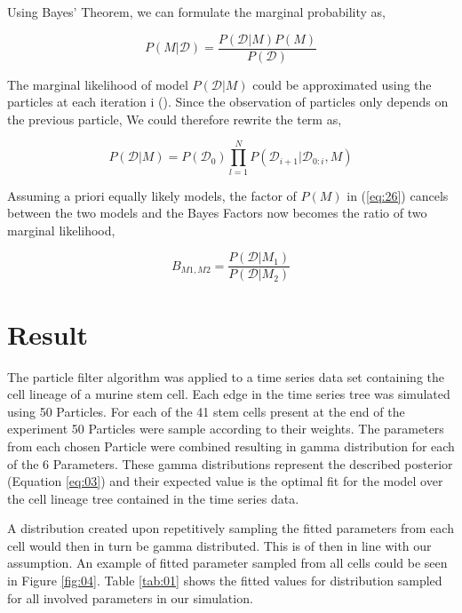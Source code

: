 \documentclass{bioinfo}
\begin{document}
Using Bayes' Theorem, we can formulate the marginal probability as,

\begin{equation}
P(M | \mathcal{D}) = \frac{P(\mathcal{D} | M) P(M)}{P(\mathcal{D})}\label{eq:27}
\end{equation}

The marginal likelihood of model $P(\mathcal{D} | M)$ could be approximated using the particles at each iteration i (\citealp{Wilkinson11}). Since the observation of particles only depends on the previous particle, We could therefore rewrite the term as,

\begin{equation}
P(\mathcal{D} | M) = P(\mathcal{D_0}) \prod_{l=1}^{N} P(\mathcal{D}_{i+1} | \mathcal{D}_{0:i}, M)\label{eq:28}
\end{equation}

Assuming a priori equally likely models, the factor of $P(M)$ in (\ref{eq:26}) cancels between the two models and the Bayes Factors now becomes the ratio of two marginal likelihood,

\begin{equation}
B_{M1, M2} = \frac{P(\mathcal{D} | M_1)}{P(\mathcal{D} | M_2)}\label{eq:29}
\end{equation}

\section{Result}

The particle filter algorithm was applied to a time series data set containing the cell lineage of a murine stem cell. Each edge in the time series tree was simulated using 50 Particles. For each of the 41 stem cells present at the end of the experiment 50 Particles were sample according to their weights. The parameters from each chosen Particle were combined resulting in gamma distribution for each of the 6 Parameters. These gamma distributions represent the described posterior (Equation \ref{eq:03}) and their expected value is the optimal fit for the model over the cell lineage tree contained in the time series data.

A distribution created upon repetitively sampling the fitted parameters from each cell would then in turn be gamma distributed. This is of then in line with our assumption. An example of fitted parameter sampled from all cells could be seen in Figure \ref{fig:04}. Table \ref{tab:01} shows the fitted values for distribution sampled for all involved parameters in our simulation.
\end{document}
